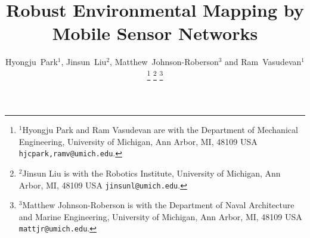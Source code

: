 \documentclass[letterpaper, 10 pt, conference]{ieeeconf}
\begin{document}
	
	

%
\title{\LARGE \bf
	 Robust Environmental Mapping by Mobile Sensor Networks
}
%
%
%

\author{Hyongju~Park${}^1$, Jinsun~Liu${}^2$, Matthew~Johnson-Roberson${}^3$ and Ram~Vasudevan${}^1$
\thanks{${}^1$Hyongju Park and Ram Vasudevan are with the Department
	of Mechanical Engineering, University of Michigan, Ann Arbor,
	MI, 48109 USA {\tt\small hjcpark,ramv@umich.edu}.}%
\thanks{${}^2$Jinsun Liu is with the Robotics Institute, University of Michigan, Ann Arbor,
	MI, 48109 USA {\tt\small jinsunl@umich.edu}.}%
\thanks{${}^3$Matthew Johnson-Roberson is with the Department of Naval Architecture and Marine Engineering, University of Michigan, Ann Arbor,
	MI, 48109 USA {\tt\small mattjr@umich.edu}.}%
}%




\end{document}
